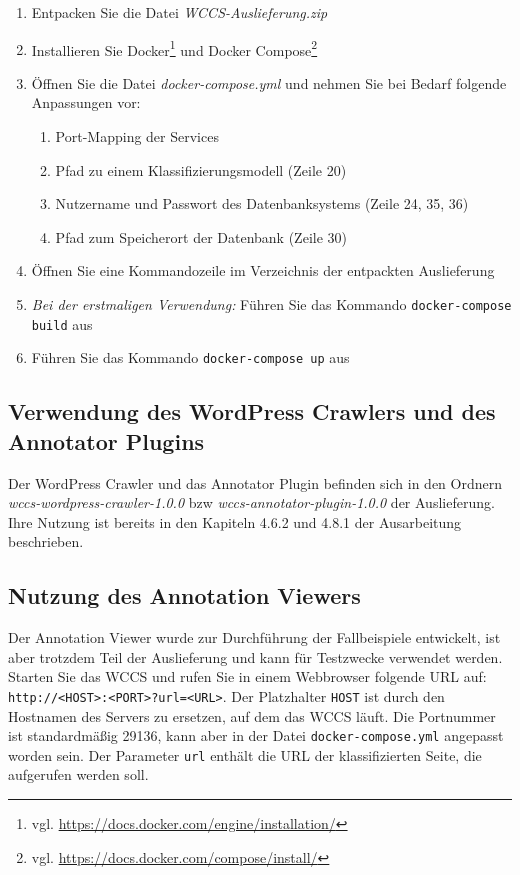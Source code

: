 \documentclass[parskip=half]{scrartcl}
\begin{document}
        \begin{enumerate}
            \item   Entpacken Sie die Datei \textit{WCCS-Auslieferung.zip}
            \item   Installieren Sie Docker\footnote{vgl. \url{https://docs.docker.com/engine/installation/}}
                    und Docker Compose\footnote{vgl. \url{https://docs.docker.com/compose/install/}}
            \item   Öffnen Sie die Datei \textit{docker-compose.yml} und nehmen Sie bei Bedarf folgende Anpassungen vor:
                    \begin{enumerate}
                        \item Port-Mapping der Services
                        \item Pfad zu einem Klassifizierungsmodell (Zeile 20)
                        \item Nutzername und Passwort des Datenbanksystems (Zeile 24, 35, 36)
                        \item Pfad zum Speicherort der Datenbank (Zeile 30)
                    \end{enumerate}
            \item   Öffnen Sie eine Kommandozeile im Verzeichnis der entpackten Auslieferung
            \item   \textit{Bei der erstmaligen Verwendung: } Führen Sie das Kommando \texttt{docker-compose build} aus
            \item   Führen Sie das Kommando \texttt{docker-compose up} aus
        \end{enumerate}

    \subsection*{Verwendung des WordPress Crawlers und des Annotator Plugins}
        Der WordPress Crawler und das Annotator Plugin befinden sich in den
        Ordnern \textit{wccs-wordpress-crawler-1.0.0}
        bzw \textit{wccs-annotator-plugin-1.0.0} der Auslieferung.
        Ihre Nutzung ist bereits in den Kapiteln 4.6.2 und 4.8.1
        der Ausarbeitung beschrieben.

    \subsection*{Nutzung des Annotation Viewers}
        Der Annotation Viewer wurde zur Durchführung der Fallbeispiele entwickelt,
        ist aber trotzdem Teil der Auslieferung und kann für Testzwecke verwendet werden.
        Starten Sie das WCCS und rufen Sie in einem Webbrowser folgende URL auf:
        \texttt{http://<HOST>:<PORT>?url=<URL>}.
        Der Platzhalter \texttt{HOST} ist durch den Hostnamen des Servers zu ersetzen,
        auf dem das WCCS läuft. Die Portnummer ist standardmäßig 29136, kann aber in der
        Datei \texttt{docker-compose.yml} angepasst worden sein.
        Der Parameter \texttt{url} enthält die URL der klassifizierten Seite,
        die aufgerufen werden soll.
\end{document}

